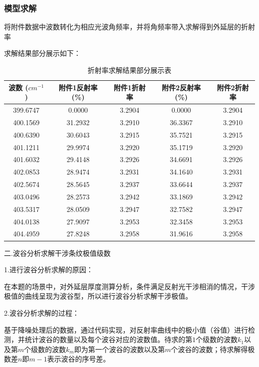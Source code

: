 \documentclass[UTF8]{ctexart}
\begin{document}
\subsubsection{模型求解}
将附件数据中波数转化为相应光波角频率，并将角频率带入求解得到外延层的折射率\par
求解结果部分展示如下：\par
\begin{table}[H]
		\caption{折射率求解结果部分展示表}
	\centering
	\renewcommand{\tabcolsep}{9pt}
	\begin{tabular}{ccccc}
		\toprule[1.5pt]
	波数 ($cm^{-1}$) & 附件1反射率 (\%) & 附件1折射率 & 附件2反射率 (\%) & 附件2折射率  \\ 
		\midrule[1pt]
	399.6747  & 0.0000  & 3.2904  & 0.0000  & 3.2904   \\ 
	400.1569  & 31.2932  & 3.2910  & 36.3367  & 3.2910   \\ 
	400.6390  & 30.6043  & 3.2915  & 35.7521  & 3.2915   \\ 
	401.1211  & 29.9974  & 3.2920  & 35.1719  & 3.2920   \\ 
	401.6032  & 29.4148  & 3.2926  & 34.6691  & 3.2926   \\ 
	402.0853  & 28.9474  & 3.2931  & 34.1640  & 3.2931   \\ 
	402.5674  & 28.5645  & 3.2937  & 33.6644  & 3.2937   \\ 
	403.0496  & 28.2573  & 3.2942  & 33.1869  & 3.2942   \\ 
	403.5317  & 28.0509  & 3.2947  & 32.7582  & 3.2947   \\ 
	404.0138  & 27.9097  & 3.2953  & 32.3458  & 3.2953   \\ 
	404.4959  & 27.8248  & 3.2958  & 31.9616  & 3.2958   \\ 
		\bottomrule[1pt]
	\end{tabular}
\end{table}
二.波谷分析求解干涉条纹极值级数\par 
1.进行波谷分析求解的原因：\par 
在本题的场景中，对外延层厚度测算分析，条件满足反射光干涉相消的情况，干涉极值的曲线呈现为波谷型，所以进行波谷分析求解干涉极值。\par 
2.波谷分析求解的过程：\par 
基于降噪处理后的数据，通过代码实现，对反射率曲线中的极小值（谷值）进行检测，并统计波谷的数量以及每个波谷对应的波数值。待求的第$1$个级数的波数$k_1$以及第$m$个级数的波数$k_m$即为第一个波谷的波数以及第$m$个波谷的波数；待求解得极数差$n$即$m-1$表示波谷的序号差。\par 
\end{document}
